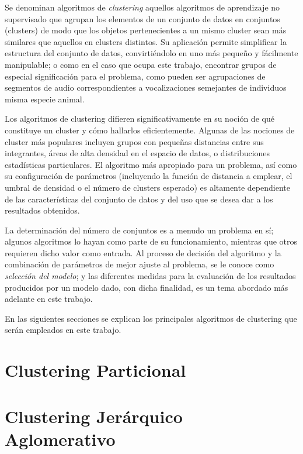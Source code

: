 Se denominan algoritmos de \textit{clustering} aquellos algoritmos de aprendizaje no supervisado que agrupan los elementos de un conjunto de datos en conjuntos (clusters) de modo que los objetos pertenecientes a un mismo cluster sean más similares que aquellos en clusters distintos.
Su aplicación permite simplificar la estructura del conjunto de datos, convirtiéndolo en uno más pequeño y fácilmente manipulable;
o como en el caso que ocupa este trabajo, encontrar grupos de especial significación para el problema, como pueden ser agrupaciones de segmentos de audio correspondientes a vocalizaciones semejantes de individuos misma especie animal.

Los algoritmos de clustering difieren significativamente en su noción de qué constituye un cluster y cómo hallarlos eficientemente.
Algunas de las nociones de cluster más populares incluyen grupos con pequeñas distancias entre sus integrantes, áreas de alta densidad en el espacio de datos, o distribuciones estadísticas particulares.
El algoritmo más apropiado para un problema, así como su configuración de parámetros (incluyendo la función de distancia a emplear, el umbral de densidad o el número de clusters esperado) es altamente dependiente de las características del conjunto de datos y del uso que se desea dar a los resultados obtenidos.

La determinación del número de conjuntos es a menudo un problema en sí;
algunos algoritmos lo hayan como parte de su funcionamiento, mientras que otros requieren dicho valor como entrada.
Al proceso de decisión del algoritmo y la combinación de parámetros de mejor ajuste al problema, se le conoce como \textit{selección del modelo};
y las diferentes medidas para la evaluación de los resultados producidos por un modelo dado, con dicha finalidad, es un tema abordado más adelante en este trabajo.

En las siguientes secciones se explican los principales algoritmos de clustering que serán empleados en este trabajo.

\section{Clustering Particional}\label{sec:clusteringParticional}


\section{Clustering Jerárquico Aglomerativo}\label{sec:clusteringJerárquicoAglomerativo}


